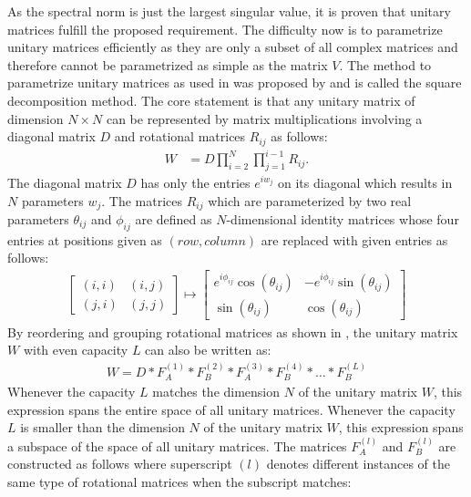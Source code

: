 \documentclass[draft,final]{vutinfth} %
\begin{document}
    As the spectral norm is just the largest singular value, it is proven that unitary matrices fulfill the proposed requirement.
    The difficulty now is to parametrize unitary matrices efficiently as they are only a subset of all complex matrices and therefore cannot be parametrized as simple as the matrix $V$.
    The method to parametrize unitary matrices as used in \cite[p. 3]{EfficientUnitaryRNNs} was proposed by \cite{UnitaryMatrixParametrization} and is called the square decomposition method. 
    The core statement is that any unitary matrix of dimension $N \times N$ can be represented by matrix multiplications involving a diagonal matrix $D$ and rotational matrices $R_{ij}$ as follows:
    \begin{align}
    W &= D \prod_{i=2}^N \prod_{j=1}^{i-1} R_{ij}.
    \end{align}
    The diagonal matrix $D$ has only the entries $e^{iw_j}$ on its diagonal which results in $N$ parameters $w_j$.
    The matrices $R_{ij}$ which are parameterized by two real parameters $\theta_{ij}$ and $\phi_{ij}$ are defined as $N$-dimensional identity matrices whose four entries at positions given as $(row,column)$ are replaced with given entries as follows:
    \begin{align}
    \begin{bmatrix} 
    (i,i) & (i,j) \\
    (j,i) & (j,j) 
    \end{bmatrix} \mapsto 
    \begin{bmatrix} 
    e^{i\phi_{ij}}\cos (\theta_{ij})  & -e^{i\phi_{ij}}\sin (\theta_{ij}) \\
    \sin (\theta_{ij}) & \cos (\theta_{ij}) 
    \end{bmatrix}
    \end{align}
    By reordering and grouping rotational matrices as shown in \cite[p. 4]{EfficientUnitaryRNNs}, the unitary matrix $W$ with even capacity $L$ can also be written as:
    \begin{align}
    W = D * F_A^{(1)} * F_B^{(2)} * F_A^{(3)} * F_B^{(4)} * \ldots * F_B^{(L)}
    \end{align}
    Whenever the capacity $L$ matches the dimension $N$ of the unitary matrix $W$, this expression spans the entire space of all unitary matrices. 
    Whenever the capacity $L$ is smaller than the dimension $N$ of the unitary matrix $W$, this expression spans a subspace of the space of all unitary matrices. 
    The matrices $F_A^{(l)}$ and $F_B^{(l)}$ are constructed as follows where superscript $(l)$ denotes different instances of the same type of rotational matrices when the subscript matches:
\end{document}
